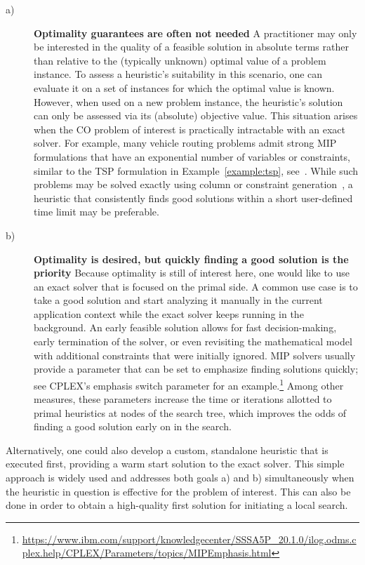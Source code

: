 \documentclass[twoside,11pt]{article}
\begin{document}
\begin{description}
	\item[a)] \textbf{Optimality guarantees are often not needed} A practitioner may only be interested in the quality of a feasible solution in absolute terms rather than relative to the (typically unknown) optimal value of a problem instance. To assess a heuristic's suitability in this scenario, one can evaluate it on a set of instances for which the optimal value is known. However, when used on a new problem instance, the heuristic's solution can only be assessed via its (absolute) objective value. This situation arises when the CO problem of interest is practically intractable with an exact solver. For example, many vehicle routing problems admit strong MIP formulations that have an exponential number of variables or constraints, similar to the TSP formulation in Example~\ref{example:tsp}, see~\cite{toth2014vehicle}. While such problems may be solved exactly using column or constraint generation~\citep{dror1994vehicle}, a heuristic that consistently finds good solutions within a short user-defined time limit may be preferable.

	\item[b)] \textbf{Optimality is desired, but quickly finding a good solution is the priority} Because optimality is still of interest here,
	      one would like to use an exact solver that is focused on the primal side. A common use case is to take a good solution and start analyzing it manually in the current application context while the exact solver keeps running in the background. An early feasible solution allows for fast decision-making, early termination of the solver, or even revisiting the mathematical model with additional constraints that were initially ignored. MIP solvers usually provide a parameter that can be set to emphasize finding solutions quickly; see CPLEX's emphasis switch parameter for an example.\footnote{\url{https://www.ibm.com/support/knowledgecenter/SSSA5P_20.1.0/ilog.odms.cplex.help/CPLEX/Parameters/topics/MIPEmphasis.html}} Among other measures, these parameters increase the time or iterations allotted to primal heuristics at nodes of the search tree, which improves the odds of finding a good solution early on in the search.
\end{description}

Alternatively, one could also develop a custom, standalone heuristic that is executed first, providing a warm start solution to the exact solver. This simple approach is widely used and addresses both goals a) and b) simultaneously when the heuristic in question is effective for the problem of interest. This can also be done in order to obtain a high-quality first solution for initiating a local search.
\end{document}
